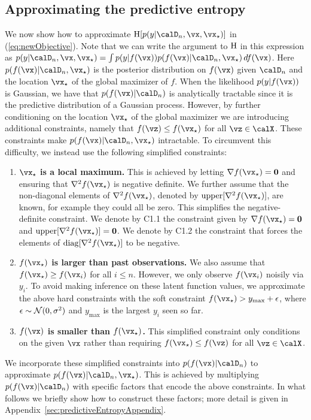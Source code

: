 \subsection{Approximating the predictive entropy}\label{sec:predictiveEntropy}

We now show how to approximate $\H[p(y|\D_n,\x,\xopt)]$ in
(\ref{eq:newObjective}). Note that we can write the argument to $\mathrm{H}$ in this expression as
$p(y|\D_n,\x,\xopt) = \int p(y|f(\x)) p(f(\x)|\D_n,\xopt)\,df(\x)$.  
Here $p(f(\x)|\D_n,\xopt)$ is the posterior distribution on $f(\x)$ given 
$\D_n$ and the location $\xopt$ of the global maximizer of $f$.
When the likelihood $p(y|f(\x))$ is Gaussian, we have that
$p(f(\x)|\D_n)$ is analytically tractable since it is the predictive distribution
of a Gaussian process.  However, by further conditioning on the location $\xopt$
of the global maximizer we are introducing additional constraints, namely that $f(\vz)\leq f(\xopt)$ for all $\vz\in\X$.
These constraints make $p(f(\x)|\D_n,\xopt)$ intractable.  To circumvent this
difficulty, we instead use the following simplified constraints:
\begin{enumerate}
    \item[C1.] \textbf{$\xopt$ is a local maximum.} This is achieved by letting $\nabla
    f(\xopt)=\zero$ and ensuring that $\nabla^{2}f(\xopt)$ is negative
    definite. We further assume that the non-diagonal elements of
    $\nabla^{2}f(\xopt)$, denoted by $\upper[\nabla^{2}f(\xopt)]$, are known,
    for example they could all be zero. This simplifies the negative-definite constraint.
    We denote by C1.1 the constraint given by $\nabla f(\xopt)=\zero$ and $\upper[\nabla^2 f(\xopt)] = \zero$.
    We denote by C1.2 the constraint that forces the elements of $\diag[\nabla^2 f(\xopt)]$ to be negative.

    \item[C2.] \textbf{$f(\xopt)$ is larger than past observations.} 
    We also assume that $f(\xopt)\geq f(\x_i)$ for all $i\leq n$.
    However, we only observe $f(\x_i)$ noisily via $y_i$.
    To avoid making inference on these latent function values, we approximate the above hard constraints
    with the soft constraint $f(\xopt) > y_\mathrm{max} + \epsilon$, where
    $\epsilon\sim\mathcal{N}(0,\sigma^2)$ and $y_\mathrm{max}$ is the largest $y_i$ seen so far.
    
    \item[C3.] \textbf{$f(\x)$ is smaller than $f(\xopt)$.} This simplified
    constraint only conditions on the given $\x$ rather than requiring
    $f(\xopt)\leq f(\vz)$ for all $\vz\in\X$.
\end{enumerate}
We incorporate these simplified constraints into $p(f(\x)|\D_n)$ to 
approximate $p(f(\x)|\D_n,\xopt)$.  This is achieved by multiplying
$p(f(\x)|\D_n)$ with specific factors that encode the above constraints. In what
follows we briefly show how to construct these factors; more detail is given in
Appendix~\ref{sec:predictiveEntropyAppendix}.

